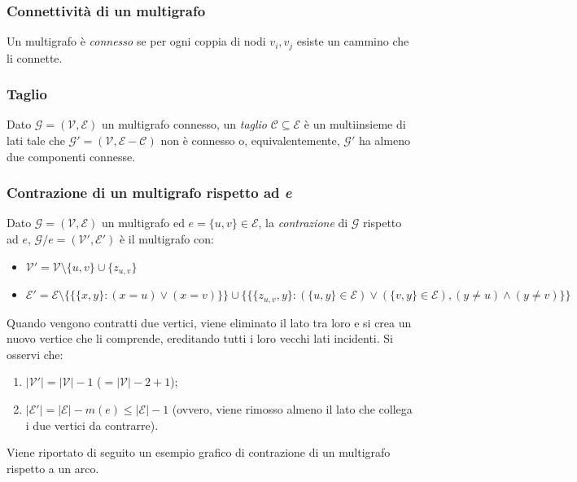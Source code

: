 \subsubsection*{Connettività di un multigrafo}
Un multigrafo è \textit{connesso} se per ogni coppia di nodi $v_i, v_j$ esiste un cammino che li connette.

\subsubsection*{Taglio}
Dato $\mathcal{G}=(\mathcal{V}, \mathcal{E})$ un multigrafo connesso, un \textit{taglio} $\mathcal{C} \subseteq \mathcal{E}$ è un multiinsieme di lati tale che $\mathcal{G}{}'=(\mathcal{V}, \mathcal{E}-\mathcal{C})$ non è connesso o, equivalentemente, $\mathcal{G}{}'$ ha almeno due componenti connesse.

\subsubsection*{Contrazione di un multigrafo rispetto ad \textit{e}}
Dato $\mathcal{G}=(\mathcal{V}, \mathcal{E})$ un multigrafo ed $e=\{u,v\} \in \mathcal{E}$, la \textit{contrazione} di $\mathcal{G}$ rispetto ad $e$, $\mathcal{G}/e=(\mathcal{V}{}', \mathcal{E}{}')$ è il multigrafo con:
\begin{itemize}
    \item[] $\mathcal{V}{}'=\mathcal{V} \setminus \{u, v\} \cup \{z_{u,v}\}$
    \item[] $\mathcal{E}{}'=\mathcal{E} \setminus \{\{\{x, y\}: (x=u) \vee (x=v)\}\} \cup \{\{\{z_{u,v}, y\}: (\{u,y\} \in \mathcal{E}) \vee (\{v,y\} \in \mathcal{E}), (y\neq u) \wedge (y \neq v) \}\}$
\end{itemize}
Quando vengono contratti due vertici, viene eliminato il lato tra loro e 
si crea un nuovo vertice che li comprende, ereditando tutti i loro vecchi lati 
incidenti. Si osservi che:
\begin{enumerate}
    \item $|\mathcal{V}'| = |\mathcal{V}| - 1$ ($= |\mathcal{V}| - 2 + 1$);
    \item $|\mathcal{E}'| = |\mathcal{E}| - m(e) \le |\mathcal{E}| - 1$ (ovvero, viene 
    rimosso almeno il lato che collega i due vertici da contrarre).
\end{enumerate}

Viene riportato di seguito un esempio grafico di contrazione di un multigrafo rispetto a un arco.

